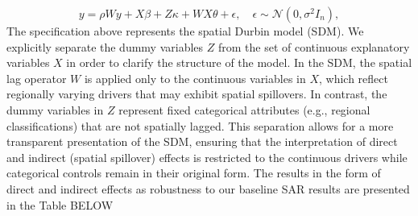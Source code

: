 \documentclass[
	a4paper, %
	10pt, %
]{LTJournalArticle}
\begin{document}
\begin{equation}
y = \rho W y + X\beta + Z\kappa + W X \theta + \epsilon,
\quad \epsilon \sim \mathcal{N}(0,\sigma^2 I_n),
\end{equation}
The specification above represents the spatial Durbin model (SDM). We explicitly separate the dummy variables $Z$ from the set of continuous explanatory variables $X$ in order to clarify the structure of the model. In the SDM, the spatial lag operator $W$ is applied only to the continuous variables in $X$, which reflect regionally varying drivers that may exhibit spatial spillovers. In contrast, the dummy variables in $Z$ represent fixed categorical attributes (e.g., regional classifications) that are not spatially lagged. This separation allows for a more transparent presentation of the SDM, ensuring that the interpretation of direct and indirect (spatial spillover) effects is restricted to the continuous drivers while categorical controls remain in their original form. The results in the form of direct and indirect effects as robustness to our baseline SAR results are presented in the Table BELOW
\end{document}
